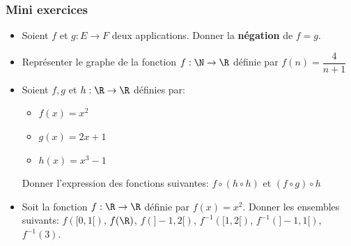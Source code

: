 \begin{frame}[<+->]
  \frametitle{Mini exercices}
  \small
  \begin{itemize}
    \item Soient $f$ et $g: E\rightarrow F$ deux applications. Donner la
      \textbf{négation}   de $f=g$.
    \item Représenter le graphe de la fonction $f:\N\rightarrow\R$ définie par
      $f(n)=\dfrac{4}{n+1}$
    \item Soient $f, g$ et $h: \R\rightarrow\R$ définies par:
      \begin{itemize}
        \item $f(x) = x^2$
        \item $g(x) = 2x + 1$
        \item $h(x) = x^3 - 1$
      \end{itemize}
      Donner l'expression des fonctions suivantes: $f\circ\left(h\circ h\right)$ et
      $\left(f\circ g\right)\circ h$
      \item Soit la fonction $f:\R\rightarrow\R$ définie par $f(x)=x^2$. Donner
        les ensembles suivants: $f([0,1[)$, $f(\R)$, $f(]-1,2[)$,
        $f^{-1}([1,2[)$, $f^{-1}(]-1,1[)$, $f^{-1}(3)$.
  \end{itemize}
\end{frame}
